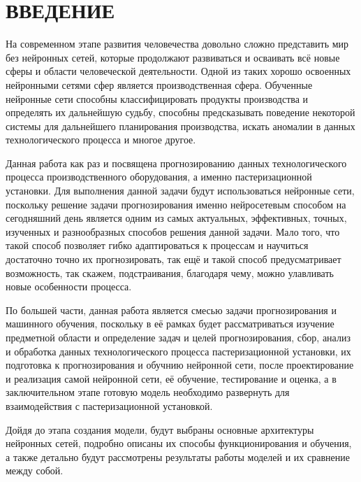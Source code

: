 \sectionbreak \section*{ 
    \cyrillicfont
    \fontsize{14pt}{24pt}\selectfont 
    \redline
    ВВЕДЕНИЕ
}
\titlespace

{\cyrillicfont
\fontsize{13pt}{16.25pt}\selectfont 
\englishfont 

\par \redline На современном этапе развития человечества довольно сложно представить мир без нейронных сетей, которые продолжают развиваться и осваивать всё новые сферы и области человеческой деятельности. Одной из таких хорошо освоенных нейронными сетями сфер является производственная сфера. Обученные нейронные сети способны классифицировать продукты производства и определять их дальнейшую судьбу, способны предсказывать поведение некоторой системы для дальнейшего планирования производства, искать аномалии в данных технологического процесса и многое другое. 

\par \redline Данная работа как раз и посвящена прогнозированию данных технологического процесса производственного оборудования, а именно пастеризационной установки. Для выполнения данной задачи будут использоваться нейронные сети, поскольку решение задачи прогнозирования именно нейросетевым способом на сегодняшний день является одним из самых актуальных, эффективных, точных, изученных и разнообразных способов решения данной задачи. Мало того, что такой способ позволяет гибко адаптироваться к процессам и научиться достаточно точно их прогнозировать, так ещё и такой способ предусматривает возможность, так скажем, подстраивания, благодаря чему, можно улавливать новые особенности процесса. 

\par \redline По большей части, данная работа является смесью задачи прогнозирования и машинного обучения, поскольку в её рамках будет рассматриваться изучение предметной области и определение задач и целей прогнозирования, сбор, анализ и обработка данных технологического процесса пастеризационной установки, их подготовка к прогнозирования и обучнию нейронной сети, после проектирование и реализация самой нейронной сети, её обучение, тестирование и оценка, а в заключительном этапе готовую модель необходимо развернуть для взаимодействия с пастеризационной установкой.

\par \redline Дойдя до этапа создания модели, будут выбраны основные архитектуры нейронных сетей, подробно описаны их способы функционирования и обучения, а также детально будут рассмотрены результаты работы моделей и их сравнение между собой.

\par
}
